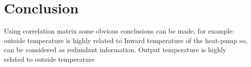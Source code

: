 \documentclass{scrartcl}
\begin{document}
\section{Conclusion} 
Using correlation matrix some obvious conclusions can be made, for example: outside temperature is highly related to Inward temperature of the heat-pump so, can be considered as redundant information. Output temperature is highly related to outside temperature 











%


\end{document}
